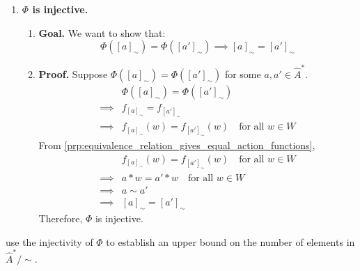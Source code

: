 \begin{proofE}
\begin{enumerate}
    \item \textbf{$\Phi$ is injective.}
    \begin{enumerate}
        \item \textbf{Goal.}
        We want to show that:
        \begin{equation}
            \Phi([a]_{\sim}) = \Phi([a']_{\sim}) \implies [a]_{\sim} = [a']_{\sim}
        \end{equation}
        
        \item \textbf{Proof.}
        Suppose $\Phi([a]_{\sim}) = \Phi([a']_{\sim})$ for some $a, a' \in \hat{A}^{*}$.
        \begin{align}
            & \Phi([a]_{\sim}) = \Phi([a']_{\sim}) \\
            \implies & f_{[a]_{\sim}} = f_{[a']_{\sim}} \\
            \implies & f_{[a]_{\sim}}(w) = f_{[a']_{\sim}}(w) \quad \text{for all $w \in W$}
        \end{align}
        From \cref{prp:equivalence_relation_gives_equal_action_functions},
        \begin{align}
            & f_{[a]_{\sim}}(w) = f_{[a']_{\sim}}(w) \quad \text{for all $w \in W$} \\
            \implies & a \ast w = a' \ast w \quad \text{for all $w \in W$} \\
            \implies & a \sim a' \\
            \implies & [a]_{\sim} = [a']_{\sim}
        \end{align}
        Therefore, $\Phi$ is injective.
    \end{enumerate}
\end{enumerate}
\end{proofE}


 use the injectivity of $\Phi$ to establish an upper bound on the number of elements in $\hat{A}^{*}/\sim$.

